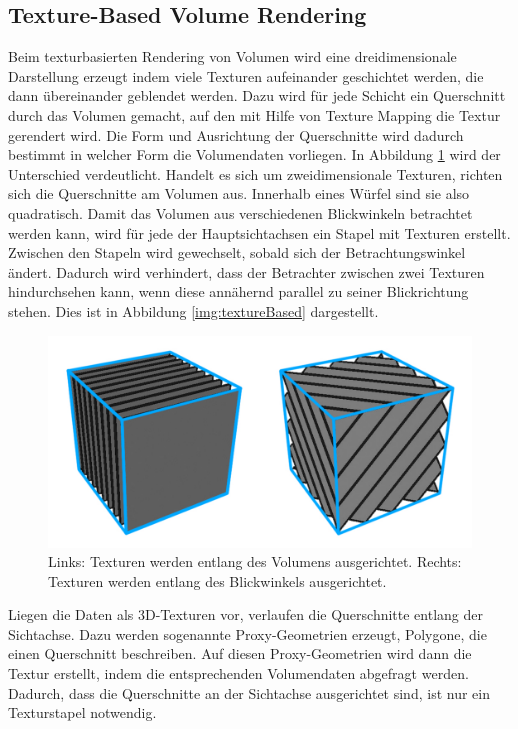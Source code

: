 \subsection{Texture-Based Volume Rendering}

Beim texturbasierten Rendering von Volumen wird eine dreidimensionale Darstellung erzeugt indem viele Texturen aufeinander geschichtet werden, die dann übereinander geblendet werden. Dazu wird für jede Schicht ein Querschnitt durch das Volumen gemacht, auf den mit Hilfe von Texture Mapping die Textur gerendert wird.
Die Form und Ausrichtung der Querschnitte wird dadurch bestimmt in welcher Form die Volumendaten vorliegen. In Abbildung \ref{img:2D3DTex} wird der Unterschied verdeutlicht. Handelt es sich um zweidimensionale Texturen,  richten sich die Querschnitte am Volumen aus. Innerhalb eines Würfel sind sie also quadratisch. Damit das Volumen aus verschiedenen Blickwinkeln betrachtet werden kann, wird für jede der Hauptsichtachsen ein Stapel mit Texturen erstellt. Zwischen den Stapeln wird gewechselt, sobald sich der Betrachtungswinkel ändert. Dadurch wird verhindert, dass der Betrachter zwischen zwei Texturen hindurchsehen kann, wenn diese annähernd parallel zu seiner Blickrichtung stehen. Dies ist in Abbildung \ref{img:textureBased} dargestellt.

\begin{figure}[!htb]
	\centering
	\includegraphics[width=0.7\linewidth]{images/texture_2d3d.pdf}
	\caption{Links: Texturen werden entlang des Volumens ausgerichtet. Rechts: Texturen werden entlang des Blickwinkels ausgerichtet.}
	\label{img:2D3DTex}
\end{figure}
\FloatBarrier

Liegen die Daten als 3D-Texturen vor, verlaufen die Querschnitte entlang der Sichtachse. Dazu werden sogenannte Proxy-Geometrien erzeugt, Polygone, die einen Querschnitt beschreiben. Auf diesen Proxy-Geometrien wird dann die Textur erstellt, indem die entsprechenden Volumendaten abgefragt werden. Dadurch, dass die Querschnitte an der Sichtachse ausgerichtet sind, ist nur ein Texturstapel notwendig. 


